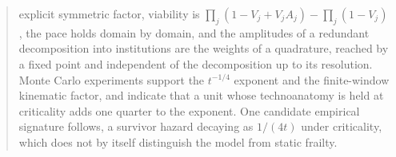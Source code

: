 \begin{abstract}
explicit symmetric factor, viability is $\prod_j(1-V_j+V_jA_j)-\prod_j(1-V_j)$, the pace holds domain by domain, and the amplitudes of a redundant decomposition into institutions are the weights of a quadrature, reached by a fixed point and independent of the decomposition up to its resolution. Monte Carlo experiments support the $t^{-1/4}$ exponent and the finite-window kinematic factor, and indicate that a unit whose technoanatomy is held at criticality adds one quarter to the exponent. One candidate empirical signature follows, a survivor hazard decaying as $1/(4t)$ under criticality, which does not by itself distinguish the model from static frailty.

\end{abstract}
